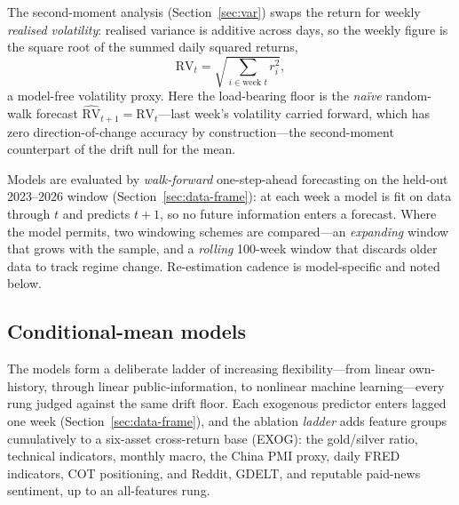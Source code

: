 \documentclass[12pt, a4paper]{article}
\begin{document}
The second-moment analysis (Section~\ref{sec:var}) swaps the return for weekly
\emph{realised volatility}: realised variance is additive across days, so the weekly figure
is the square root of the summed daily squared returns,
\begin{equation}
    \mathrm{RV}_t = \sqrt{\textstyle\sum_{i \in \text{week } t} r_i^2 },
    \label{eq:rv}
\end{equation}
a model-free volatility proxy. Here the load-bearing floor is the \emph{na\"ive} random-walk
forecast \(\widehat{\mathrm{RV}}_{t+1} = \mathrm{RV}_t\)---last week's volatility carried
forward, which has zero direction-of-change accuracy by construction---the second-moment
counterpart of the drift null for the mean.

Models are evaluated by \emph{walk-forward} one-step-ahead forecasting on the held-out
2023--2026 window (Section~\ref{sec:data-frame}): at each week a model is fit on data
through \(t\) and predicts \(t+1\), so no future information enters a forecast. Where the
model permits, two windowing schemes are compared---an \emph{expanding} window that grows
with the sample, and a \emph{rolling} 100-week window that discards older data to track
regime change. Re-estimation cadence is model-specific and noted below.

\subsection{Conditional-mean models}
\label{sec:method-mean}

The models form a deliberate ladder of increasing flexibility---from linear own-history,
through linear public-information, to nonlinear machine learning---every rung judged
against the same drift floor. Each exogenous predictor enters lagged one week
(Section~\ref{sec:data-frame}), and the ablation \emph{ladder} adds feature groups
cumulatively to a six-asset cross-return base (EXOG): the gold/silver ratio, technical
indicators, monthly macro, the China PMI proxy, daily FRED indicators, COT positioning, and
Reddit, GDELT, and reputable paid-news sentiment, up to an all-features rung.
\end{document}
